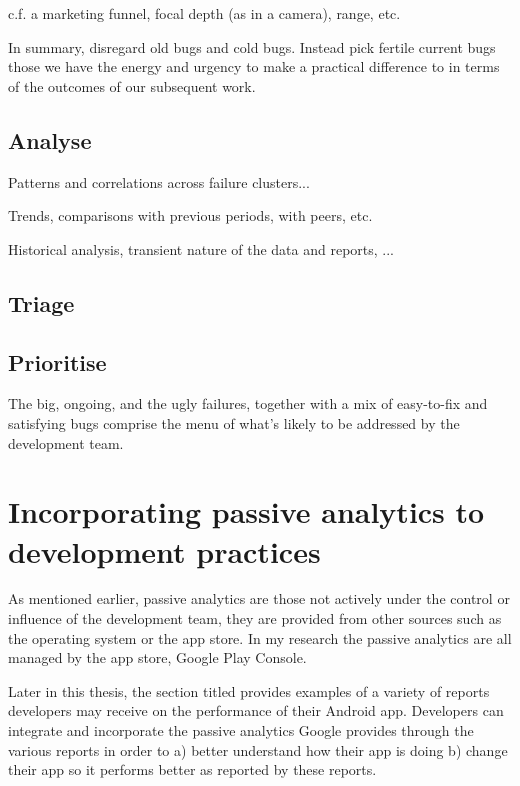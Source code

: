 c.f. a marketing funnel, focal depth (as in a camera), range, etc. 

In summary, disregard old bugs and cold bugs. Instead pick fertile current bugs those we have the energy and urgency to make a practical difference to in terms of the outcomes of our subsequent work.


\subsection{Analyse}

Patterns and correlations across failure clusters... 

Trends, comparisons with previous periods, with peers, etc.

Historical analysis, transient nature of the data and reports, ...

\subsection{Triage}



\subsection{Prioritise}
The big, ongoing, and the ugly failures, together with a mix of easy-to-fix and satisfying bugs comprise the menu of what's likely to be addressed by the development team. 



\section{Incorporating passive analytics to development practices}
As mentioned earlier, passive analytics are those not actively under the control or influence of the development team, they are provided from other sources such as the operating system or the app store. In my research the passive analytics are all managed by the app store, Google Play Console.

Later in this thesis, the section titled \href{google_play_console_section}{\emph{}} provides examples of a variety of reports developers may receive on the performance of their Android app. Developers can integrate and incorporate the passive analytics Google provides through the various reports in order to a) better understand how their app is doing b) change their app so it performs better as reported by these reports.

